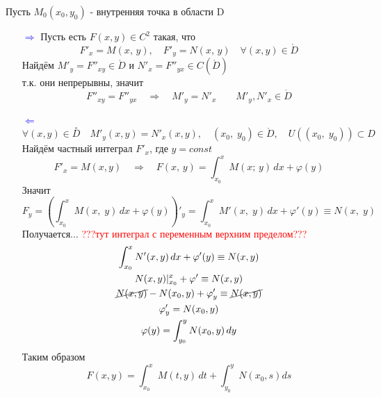\begin{Proof}
    Пусть $M_0(x_0, y_0)$ - внутренняя точка в области D\\

    \begin{enumerate}
        \item[\textcolor{blue}{$\Rightarrow$}]
            Пусть есть $F(x,y)\in C^2$ такая, что 
            \[
                F'_x=M(x,\,y), \quad F'_y=N(x,\,y) \quad \forall (x,y) \in \mathring{D}
            \]
            Найдём $M'_y=F''_{xy}\in \mathring{D}$ и $N'_x=F''_{yx}\in C(\mathring{D})$\\
            т.к. они непрерывны, значит\\
            \[
                F''_{xy}=F''_{yx} \quad \Rightarrow \quad M'_y=N'_x \qquad M'_y, N'_x \in \mathring{D}
            \]
        
        \item[\textcolor{blue}{$\Leftarrow$}]
            $\forall (x,y) \in \overset{\circ}{D} \quad M'_y(x,y)=N'_x(x,y), \quad (x_0,\; y_0) \in \mathring{D}, \quad U((x_0,\; y_0)) \subset D$\\
            Найдём частный интеграл $F'_x$, где $y=const$
            \[
                F'_x=M(x,y) \quad \Rightarrow \quad F(x,\,y)=\int_{x_0}^{x}M(x;\,y)\,dx+\varphi(y)
            \]
            Значит
            \[
                F_y=\left(\int_{x_0}^{x}M(x,\;y)\,dx+\varphi(y)\right)'_y=\int_{x_0}^{x}M'(x,\;y)\,dx + \varphi'(y) \equiv N(x,\;y)
            \]
            Получается... \textcolor{red}{???тут интеграл с переменным верхним пределом???}
            \begin{gather*}
                \int_{x_0}^{x}N'(x,y)\,dx+\varphi'(y) \equiv N(x,y)\\
                N(x,y)|_{x_0}^x + \varphi' \equiv N(x,y)\\
                \cancel{N(x,y)} - N(x_0,y) + \varphi'_y \equiv \cancel{N(x,y)}\\
                \varphi'_y=N(x_0,y)\\
                \varphi(y)=\int_{y_0}^{y}N(x_0, y)\,dy
            \end{gather*}
            Таким образом
            \[
                F(x,y)=\int_{x_0}^{x}M(t,y)\,dt+\int_{y_0}^{y}N(x_0,s)ds
            \]
            

\end{enumerate}
\end{Proof}
